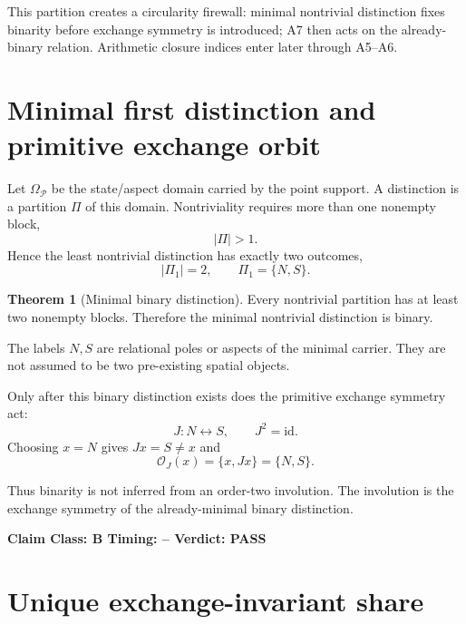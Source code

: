 \documentclass[11pt,a4paper,twoside]{book}
\theoremstyle{definition}
\newtheorem{theorem}{Theorem}[chapter]
\newcommand{\vTwelveStatus}[3]{\par\noindent\textbf{Claim Class: #1 \quad Timing: #2 \quad Verdict: #3}\par}
\begin{document}
This partition creates a circularity firewall: minimal nontrivial distinction fixes binarity before exchange symmetry is introduced; A7 then acts on the already-binary relation. Arithmetic closure indices enter later through A5--A6.

\section{Minimal first distinction and primitive exchange orbit}

Let $\Omega_{\mathcal P}$ be the state/aspect domain carried by the point support. A distinction is a partition $\Pi$ of this domain. Nontriviality requires more than one nonempty block,
\begin{equation}
|\Pi|>1.
\end{equation}
Hence the least nontrivial distinction has exactly two outcomes,
\begin{equation}
\boxed{
|\Pi_1|=2,
\qquad
\Pi_1=\{N,S\}.
}
\label{eq:v12_minimal_binary_partition}
\end{equation}

\begin{theorem}[Minimal binary distinction]
Every nontrivial partition has at least two nonempty blocks. Therefore the minimal nontrivial distinction is binary.
\end{theorem}

The labels $N,S$ are relational poles or aspects of the minimal carrier. They are not assumed to be two pre-existing spatial objects.

Only after this binary distinction exists does the primitive exchange symmetry act:
\begin{equation}
\boxed{
J:N\leftrightarrow S,
\qquad
J^2=\mathrm{id}.
}
\label{eq:v12_primitive_involution}
\end{equation}
Choosing $x=N$ gives $Jx=S\neq x$ and
\begin{equation}
\boxed{
\mathcal O_J(x)=\{x,Jx\}=\{N,S\}.
}
\label{eq:v12_primitive_binary_orbit}
\end{equation}

Thus binarity is not inferred from an order-two involution. The involution is the exchange symmetry of the already-minimal binary distinction.
\vTwelveStatus{B}{--}{PASS}

\section{Unique exchange-invariant share}
\end{document}
